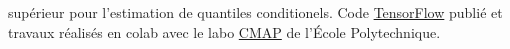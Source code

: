 \documentclass[10pt]{article} %
\begin{document}
\begin{paracol}{2}
{  supérieur pour l'estimation de quantiles conditionels.
  Code 
  \href{https://bitbucket.org/RomainBrault/itl/}{TensorFlow} publié et travaux réalisés
  en colab avec le
  labo \href{https://portail.polytechnique.edu/cmap/fr}{CMAP} de l'École
  Polytechnique.  }\par %
%
%

\end{paracol}
\end{document}
